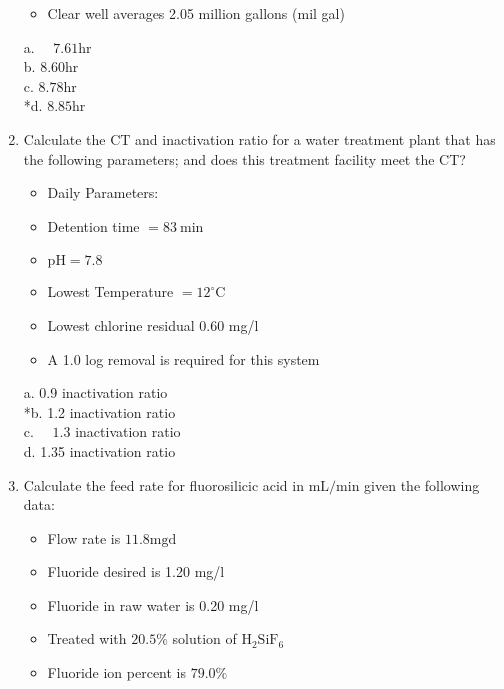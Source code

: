 \begin{enumerate}
\begin{itemize}
\item Clear well averages 2.05 million gallons (mil gal)\\
\end{itemize}
a. $\quad 7.61 \mathrm{hr}$\\
b. $8.60 \mathrm{hr}$\\
c. $8.78 \mathrm{hr}$\\
*d. $8.85 \mathrm{hr}$\\
\item Calculate the $\mathrm{CT}$ and inactivation ratio for a water treatment plant that has the following parameters; and does this treatment facility meet the CT?\\
\begin{itemize}
\item Daily Parameters:\\
\item Detention time $=83 \mathrm{~min}$\\
\item $\mathrm{pH}=7.8$\\
\item Lowest Temperature $=12^{\circ} \mathrm{C}$\\
\item Lowest chlorine residual 0.60 mg/l\\
\item A 1.0 log removal is required for this system\\
\end{itemize}
a. 0.9 inactivation ratio\\
*b. 1.2 inactivation ratio\\
c. $\quad 1.3$ inactivation ratio\\
d. 1.35 inactivation ratio\\
\item Calculate the feed rate for fluorosilicic acid in $\mathrm{mL} / \mathrm{min}$ given the following data:\\
\begin{itemize}
\item Flow rate is $11.8 \mathrm{mgd}$\\
\item Fluoride desired is 1.20 mg/l\\
\item Fluoride in raw water is 0.20 mg/l\\
\item Treated with $20.5 \%$ solution of $\mathrm{H}_{2} \mathrm{SiF}_{6}$\\
\item Fluoride ion percent is $79.0 \%$\\

\end{itemize}
\end{enumerate}
